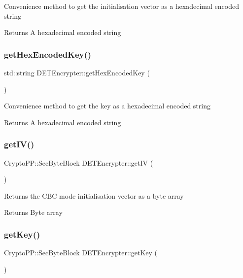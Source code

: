Convenience method to get the initialisation vector as a hexadecimal encoded string \begin{DoxyReturn}{Returns}
A hexadecimal encoded string 
\end{DoxyReturn}
\mbox{\label{classDETEncrypter_a79402704553f39cc751cc60c5ace53df}} 
\subsubsection{\texorpdfstring{get\+Hex\+Encoded\+Key()}{getHexEncodedKey()}}
{\footnotesize\ttfamily std\+::string D\+E\+T\+Encrypter\+::get\+Hex\+Encoded\+Key (\begin{DoxyParamCaption}{ }\end{DoxyParamCaption})}

Convenience method to get the key as a hexadecimal encoded string \begin{DoxyReturn}{Returns}
A hexadecimal encoded string 
\end{DoxyReturn}
\mbox{\label{classDETEncrypter_a78968a6f219de6c9d08989898d954e30}} 
\subsubsection{\texorpdfstring{get\+I\+V()}{getIV()}}
{\footnotesize\ttfamily Crypto\+P\+P\+::\+Sec\+Byte\+Block D\+E\+T\+Encrypter\+::get\+IV (\begin{DoxyParamCaption}{ }\end{DoxyParamCaption})}

Returns the C\+BC mode initialisation vector as a byte array \begin{DoxyReturn}{Returns}
Byte array 
\end{DoxyReturn}
\mbox{\label{classDETEncrypter_aa8b1e2a9a97067e338eaf5f4b6093db9}} 
\subsubsection{\texorpdfstring{get\+Key()}{getKey()}}
{\footnotesize\ttfamily Crypto\+P\+P\+::\+Sec\+Byte\+Block D\+E\+T\+Encrypter\+::get\+Key (\begin{DoxyParamCaption}{ }\end{DoxyParamCaption})}

